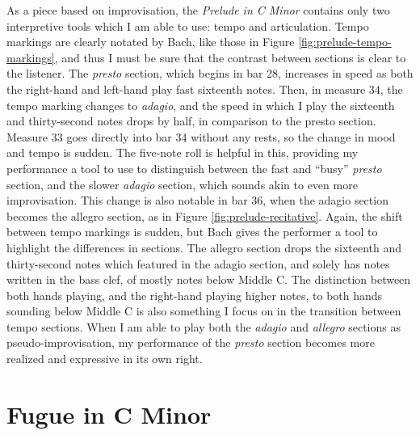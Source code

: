 As a piece based on improvisation, the \textit{Prelude in C Minor} contains only two interpretive tools which I am able to use: tempo and articulation. Tempo markings are clearly notated by Bach, like those in Figure \ref{fig:prelude-tempo-markings}\autocite{Henle_2009}, and thus I must be sure that the contrast between sections is clear to the listener. The \textit{presto} section, which begins in bar 28, increases in speed as both the right-hand and left-hand play fast sixteenth notes. Then, in measure 34, the tempo marking changes to \textit{adagio}, and the speed in which I play the sixteenth and thirty-second notes drops by half, in comparison to the presto section. Measure 33 goes directly into bar 34 without any rests, so the change in mood and tempo is sudden. The five-note roll is helpful in this, providing my performance a tool to use to distinguish between the fast and ``busy'' \textit{presto} section, and the slower \textit{adagio} section, which sounds akin to even more improvisation. This change is also notable in bar 36, when the adagio section becomes the allegro section, as in Figure \ref{fig:prelude-recitative}\autocite{Henle_2009}. Again, the shift between tempo markings is sudden, but Bach gives the performer a tool to highlight the differences in sections. The allegro section drops the sixteenth and thirty-second notes which featured in the adagio section, and solely has notes written in the bass clef, of mostly notes below Middle C. The distinction between both hands playing, and the right-hand playing higher notes, to both hands sounding below Middle C is also something I focus on in the transition between tempo sections. When I am able to play both the \textit{adagio} and \textit{allegro} sections as pseudo-improvisation, my performance of the \textit{presto} section becomes more realized and expressive in its own right. 

\section{Fugue in C Minor}

